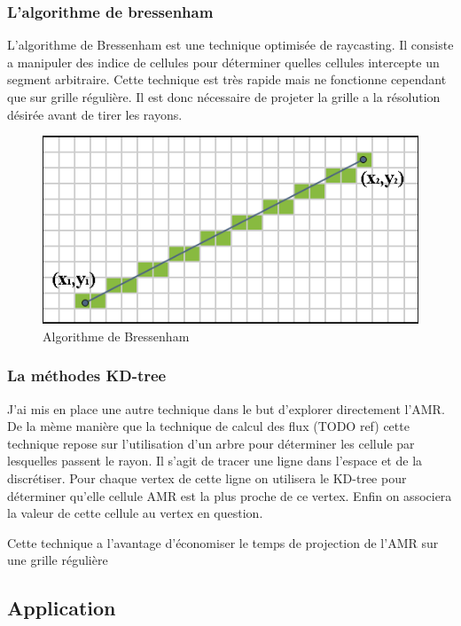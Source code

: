 \subsubsection{L'algorithme de bressenham}
L'algorithme de Bressenham est une technique optimisée de raycasting.
Il consiste a manipuler des indice de cellules pour déterminer quelles cellules intercepte un segment arbitraire.
Cette technique est très rapide mais ne fonctionne cependant que sur grille régulière.
Il est donc nécessaire de projeter la grille a la résolution désirée avant de tirer les rayons.

\begin{figure}[bth]
        \includegraphics[width=.95\linewidth]{img/04/Bresenham_line.png} 
        \caption{Algorithme de Bressenham }
 		\label{fig:bressenham}
\end{figure}

\subsubsection{La méthodes KD-tree}

J'ai mis en place une autre technique dans le but d'explorer directement l'AMR.
De la mème manière que la technique de calcul des flux (TODO ref) cette technique repose sur l'utilisation d'un arbre pour déterminer les cellule par lesquelles passent le rayon.
Il s'agit de tracer une ligne dans l'espace et de la discrétiser.
Pour chaque vertex de cette ligne on utilisera le KD-tree pour déterminer qu'elle cellule AMR est la plus proche de ce vertex.
Enfin on associera la valeur de cette cellule au vertex en question.

Cette technique a l'avantage d'économiser le temps de projection de l'AMR sur une grille régulière


\subsection{Application}

